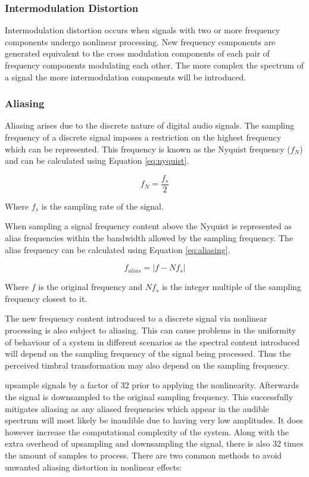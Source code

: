 		\subsubsection*{Intermodulation Distortion}
			Intermodulation distortion occurs when signals with two or more frequency components undergo
			nonlinear processing. New frequency components are generated equivalent to the cross modulation
			components of each pair of frequency components modulating each other. The more complex the
			spectrum of a signal the more intermodulation components will be introduced. 

		\subsubsection*{Aliasing}
			Aliasing arises due to the discrete nature of digital audio signals. The sampling frequency of a
			discrete signal imposes a restriction on the highest frequency which can be represented. This
			frequency is known as the Nyquist frequency ($f_{N}$) and can be calculated using Equation
			\ref{eq:nyquist}.

			\begin{equation}
				f_{N} = \frac{f_{s}}{2}
				\label{eq:nyquist}
			\end{equation}

			Where $f_{s}$ is the sampling rate of the signal.

			When sampling a signal frequency content above the Nyquist is represented as alias frequencies
			within the bandwidth allowed by the sampling frequency. The alias frequency can be calculated using
			Equation \ref{eq:aliasing}.

			\begin{equation}
				f_{alias} = |f - Nf_{s}|
				\label{eq:aliasing}
			\end{equation}

			Where $f$ is the original frequency and $Nf_{s}$ is the integer multiple of the sampling
			frequency closest to it.

			The new frequency content introduced to a discrete signal via nonlinear processing is also subject
			to aliasing. This can cause problems in the uniformity of behaviour of a system in different
			scenarios as the spectral content introduced will depend on the sampling frequency of the signal
			being processed. Thus the perceived timbral transformation may also depend on the sampling
			frequency.

			\citep{vetter2013estimation} upsample signals by a factor of 32 prior to applying
			the nonlinearity. Afterwards the signal is downsampled to the original sampling frequency. This
			successfully mitigates aliasing as any aliased frequencies which appear in the audible spectrum
			will most likely be inaudible due to having very low amplitudes. It does however increase the
			computational complexity of the system. Along with the extra overhead of upsampling and
			downsampling the signal, there is also 32 times the amount of samples to process.
			There are two common methods to avoid unwanted aliasing distortion in nonlinear effects:

